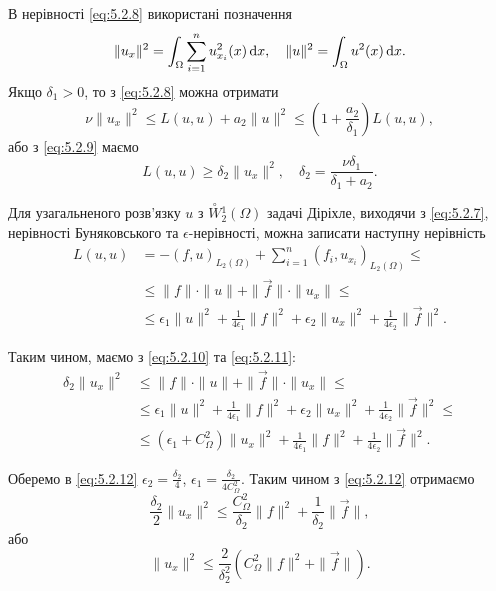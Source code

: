 В нерівності \eqref{eq:5.2.8} використані позначення \[\|u_x\|^2 = \int_\Omega \sum_{i=1}^n u_{x_i}^2(x) \mathop{}\!\mathrm{d} x,\quad \|u\|^2 = \int_\Omega u^2(x) \mathop{}\!\mathrm{d} x.\] Якщо $\delta_1 > 0$, то з \eqref{eq:5.2.8} можна отримати 
\begin{equation}
    \label{eq:5.2.9}
    \nu \|u_x\|^2 \le L(u,u) + a_2 \|u\|^2 \le \left( 1 + \frac{a_2}{\delta_1} \right) L(u, u),
\end{equation}
або з \eqref{eq:5.2.9} маємо
\begin{equation}
    \label{eq:5.2.10}
    L(u,u) \ge \delta_2 \|u_x\|^2, \quad \delta_2 = \frac{\nu \delta_1}{\delta_1 + a_2}.
\end{equation}

Для узагальненого розв'язку $u$ з $\overset{\circ}{W} {}_2^1(\Omega)$ задачі Діріхле, виходячи з \eqref{eq:5.2.7}, нерівності Буняковського та $\epsilon$-нерівності, можна записати наступну нерівність
\begin{equation}
    \label{eq:5.2.11}
    \begin{aligned}
        L(u,u)
        &= -(f,u)_{L_2(\Omega)} + \sum_{i=1}^n (f_i,u_{x_i})_{L_2(\Omega)} \le \\
        &\le \|f\| \cdot \|u\| + \|\vec f\| \cdot \|u_x\| \le \\
        &\le \epsilon_1 \|u\|^2 + \frac{1}{4\epsilon_1}\|f\|^2 + \epsilon_2\|u_x\|^2 + \frac{1}{4\epsilon_2}\|\vec f\|^2.
    \end{aligned}
\end{equation}

Таким чином, маємо з \eqref{eq:5.2.10} та \eqref{eq:5.2.11}:
\begin{equation}
    \label{eq:5.2.12}
    \begin{aligned}
        \delta_2 \|u_x\|^2
        &\le \|f\| \cdot \|u\| + \|\vec f\| \cdot \|u_x\| \le \\
        &\le \epsilon_1 \|u\|^2 + \frac{1}{4 \epsilon_1}\|f\|^2 +\epsilon_2 \|u_x\|^2 + \frac{1}{4\epsilon_2} \|\vec f\|^2 \le \\
        &\le (\epsilon_1+C_\Omega^2) \|u_x\|^2 + \frac{1}{4\epsilon_1} \|f\|^2 + \frac{1}{4\epsilon_2} \|\vec f\|^2.
    \end{aligned}
\end{equation}

Оберемо в \eqref{eq:5.2.12} $\epsilon_2=\frac{\delta_2}{4}$, $\epsilon_1=\frac{\delta_2}{4C_\Omega^2}$. Таким чином з \eqref{eq:5.2.12} отримаємо
\begin{equation}
    \label{eq:5.2.13}
    \frac{\delta_2}{2}\|u_x\|^2 \le \frac{C_\Omega^2}{\delta_2}\|f\|^2+\frac{1}{\delta_2}\|\vec f\|,
\end{equation}
або
\begin{equation}
    \label{eq:5.2.13'}
    \|u_x\|^2 \le \frac{2}{\delta_2^2} \left( C_\Omega^2 \|f\|^2+\|\vec f\| \right).
\end{equation}

